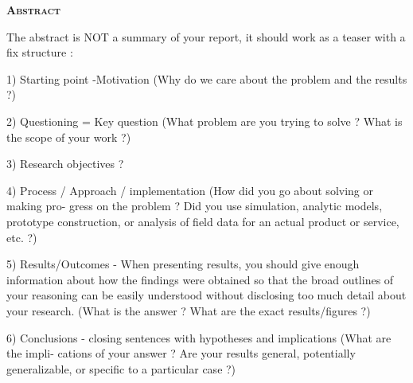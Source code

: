 \newpage


\large{\textsc{\textbf{Abstract}}}
\vspace*{0.5cm}

The abstract is NOT a summary of your report, it should work as a teaser with a fix
structure :

1) Starting point -Motivation (Why do we care about the problem and the results ?)

2) Questioning = Key question (What problem are you trying to solve ? What is the scope
of your work ?)

3) Research objectives ?

4) Process / Approach / implementation (How did you go about solving or making pro-
gress on the problem ? Did you use simulation, analytic models, prototype construction,
or analysis of field data for an actual product or service, etc. ?)

5) Results/Outcomes - When presenting results, you should give enough information
about how the findings were obtained so that the broad outlines of your reasoning can
be easily understood without disclosing too much detail about your research. (What is the
answer ? What are the exact results/figures ?)

6) Conclusions - closing sentences with hypotheses and implications (What are the impli-
cations of your answer ? Are your results general, potentially generalizable, or specific to
a particular case ?)